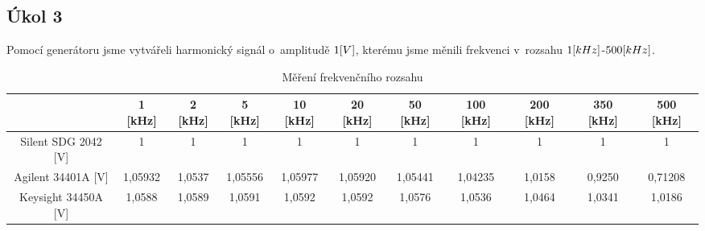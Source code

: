 \documentclass{article}
\begin{document}
\subsection*{Úkol 3}
Pomocí generátoru jsme vytvářeli harmonický signál o~amplitudě \(1\-[V]\), kterému jsme měnili frekvenci v~rozsahu \(1\-[kHz]\)-\(500\-[kHz]\).\\ 
\begin{table}[H]
    \footnotesize
    \vspace{-6mm}
    \hspace{-8mm}
    \begin{tabular}{|c|c|c|c|c|c|c|c|c|c|c|}
    \hline
                        & 1 [kHz]  	& 2 [kHz]	& 5 [kHz]	& 10 [kHz]	& 20 [kHz]	& 50 [kHz]	& 100 [kHz]	& 200 [kHz]	& 350 [kHz]	& 500 [kHz] \\ \hline
    Silent SDG 2042 [V]	& 1	        & 1	        & 1      	& 1   	    & 1   	    & 1   	    & 1   	    & 1	        & 1   	    & 1         \\ \hline
    Agilent 34401A  [V] & 1,05932	& 1,0537	& 1,05556	& 1,05977	& 1,05920	& 1,05441	& 1,04235	& 1,0158	& 0,9250	& 0,71208   \\ \hline
    Keysight 34450A [V]	& 1,0588	& 1,0589	& 1,0591	& 1,0592	& 1,0592	& 1,0576	& 1,0536	& 1,0464	& 1,0341	& 1,0186    \\ \hline
    \end{tabular}
    \caption{\label{frekvencni_rozsah} Měření frekvenčního rozsahu}
    \normalsize
\end{table}
\end{document}
